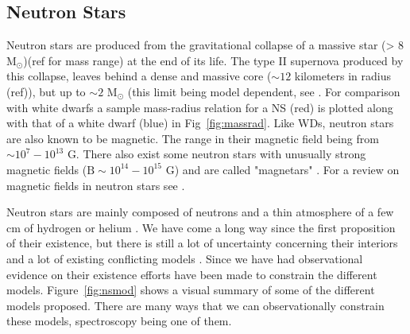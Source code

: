 \subsection{Neutron Stars}\label{sec:ns}

Neutron stars are produced from the gravitational collapse of a massive star (> 8 M$_\odot$)(ref for mass range) at the end of its life. The type II supernova produced by this collapse, leaves behind a dense and massive core ($\sim 12$ kilometers in radius (ref)), but up to $\sim 2$ M$_\odot$ (this limit being model dependent, see \cite{lattimer_neutron_2007}. For comparison with white dwarfs a sample mass-radius relation for a NS (red) is plotted along with that of a white dwarf (blue) in Fig~\ref{fig:massrad}. Like WDs, neutron stars are also known to be magnetic. The range in their magnetic field being from $\sim 10^7 - 10^{13}$ G. There also exist some neutron stars with unusually strong magnetic fields ($\text{B}\sim 10^{14} - 10^{15}\text{ G}$) and are called "magnetars" \citep{duncan_formation_1992}. For a review on magnetic fields in neutron stars see \cite{reisenegger_magnetic_2005}. 
 

Neutron stars are mainly composed of neutrons and a thin atmosphere of a few cm of hydrogen or helium \citep{zavlin_ns_1996}. We have come a long way since the first proposition of their existence, but there is still a lot of  uncertainty concerning their interiors and a lot of existing conflicting models \citep{lattimer_neutron_2007}. Since we have had observational evidence on their existence \citep{hewish_pulsar_1968} efforts have been made to constrain the different models. Figure~\ref{fig:nsmod} shows a visual summary of some of the different models proposed. There are many ways that we can observationally constrain these models, spectroscopy being one of them.

